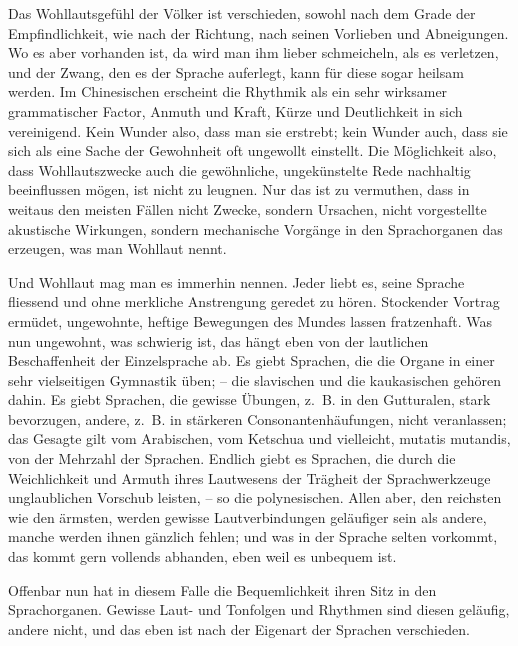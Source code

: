 {Das Wohllautsgefühl der Völker ist verschieden, sowohl nach dem \label{fp.204} Grade der Empfindlichkeit, wie nach der Richtung, nach seinen Vorlieben und Abneigungen. Wo es aber vorhanden ist, da wird man ihm lieber schmeicheln, als es verletzen, und der Zwang, den es der Sprache auferlegt, kann für diese sogar heilsam werden. Im Chinesischen erscheint die Rhythmik als ein sehr wirksamer grammatischer Factor, Anmuth und Kraft, Kürze und Deutlichkeit in sich vereinigend. Kein Wunder also, dass man sie erstrebt; kein Wunder auch, dass sie sich als eine Sache der Gewohnheit oft ungewollt einstellt. Die Möglichkeit also, dass Wohllautszwecke auch die gewöhnliche, ungekünstelte Rede nachhaltig beeinflussen mögen, ist nicht zu leugnen. Nur das ist zu vermuthen, dass in weitaus den meisten Fällen nicht Zwecke, sondern Ursachen, nicht vorgestellte akustische Wirkungen, sondern mechanische Vorgänge in den Sprachorganen das erzeugen, was man Wohllaut nennt.

Und Wohllaut mag man es immerhin nennen. Jeder liebt es, seine Sprache fliessend und ohne merkliche Anstrengung geredet zu hören. Stockender Vortrag ermüdet, ungewohnte, heftige Bewegungen des Mundes lassen fratzenhaft. Was nun ungewohnt, was schwierig ist, das hängt eben von der lautlichen Beschaffenheit der Einzelsprache ab. Es giebt Sprachen, die die Organe in einer sehr vielseitigen Gymnastik üben; – die slavischen und die kaukasischen gehören dahin. Es giebt Sprachen, die gewisse Übungen, z.~B. in den Gutturalen, stark bevorzugen, andere, z.~B. in stärkeren Consonantenhäufungen, nicht veranlassen; das Gesagte gilt vom Arabischen, vom Ketschua und vielleicht, mutatis mutandis, von der Mehrzahl der Sprachen. Endlich giebt es Sprachen, die durch die Weichlichkeit und Armuth ihres Lautwesens der Trägheit der Sprachwerkzeuge unglaublichen Vorschub leisten, – so die polynesischen. Allen aber, den reichsten wie den ärmsten, werden gewisse Lautverbindungen geläufiger sein als andere, manche werden ihnen gänzlich fehlen; und was in der \label{sp.198} Sprache selten vorkommt, das kommt gern vollends abhanden, eben weil es unbequem ist.

Offenbar nun hat in diesem Falle die Bequemlichkeit ihren Sitz in den Sprachorganen. Gewisse Laut- und Tonfolgen und Rhythmen sind diesen geläufig, andere nicht, und das eben ist nach der Eigenart der Sprachen verschieden.


}
